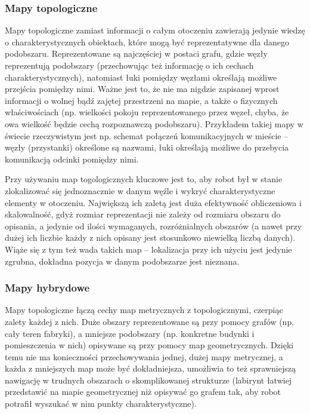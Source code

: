 \subsubsection{Mapy topologiczne}

Mapy topologiczne zamiast informacji o całym otoczeniu zawierają jedynie wiedzę
o charakterystycznych obiektach, które mogą być reprezentatywne dla danego podobszaru.
Reprezentowane są najczęściej w postaci grafu, gdzie węzły reprezentują podobszary
(przechowując też informację o ich cechach charakterystycznych), natomiast łuki
pomiędzy węzłami określają możliwe przejścia pomiędzy nimi. Ważne jest to, że nie
ma nigdzie zapisanej wprost informacji o wolnej bądź zajętej przestrzeni na mapie,
a także o fizycznych właściwościach (np. wielkości pokoju reprezentowanego przez węzeł,
chyba, że owa wielkość będzie cechą rozpoznawczą podobszaru). Przykładem takiej mapy
w świecie rzeczywistym jest np. schemat połączeń komunikacyjnych w mieście -- węzły (przystanki)
określone są nazwami, łuki określają możliwe do przebycia komunikacją odcinki pomiędzy
nimi.

Przy używaniu map togologicznych kluczowe jest to, aby robot był w stanie zlokalizować
się jednoznacznie w danym węźle i wykryć charakterystyczne elementy w otoczeniu.
Największą ich zaletą jest duża efektywność obliczeniowa i skalowalność, gdyż rozmiar
reprezentacji nie zależy od rozmiaru obszaru do opisania, a jedynie od ilości wymaganych,
rozróżnialnych obszarów (a nawet przy dużej ich liczbie każdy z nich opisany jest
stosunkowo niewielką liczbą danych). Wiąże się z tym też wada takich map -- lokalizacja
przy ich użyciu jest jedynie zgrubna, dokładna pozycja w danym podobszarze jest nieznana.

\subsubsection{Mapy hybrydowe}

Mapy topologiczne łączą cechy map metrycznych z topologicznymi, czerpiąc zalety każdej z nich.
Duże obszary reprezentowane są przy pomocy grafów (np. cały teren fabryki), a mniejsze
podobszary (np. konkretne budynki i pomieszczenia w nich) opisywane są przy pomocy
map geometrycznych. Dzięki temu nie ma konieczności przechowywania jednej, dużej
mapy metrycznej, a każda z mniejszych map może być dokładniejsza, umożliwia to też
sprawniejszą nawigację w trudnych obszarach o skomplikowanej strukturze (labirynt
łatwiej przedstawić na mapie geometrycznej niż opisywać go grafem tak, aby robot potrafił
wyszukać w nim punkty charakterystyczne).

